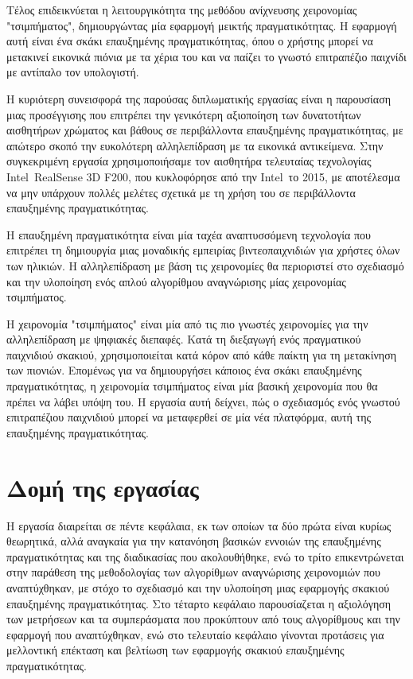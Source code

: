 Τέλος επιδεικνύεται η λειτουργικότητα της μεθόδου ανίχνευσης χειρονομίας "τσιμπήματος", δημιουργώντας μία εφαρμογή μεικτής πραγματικότητας. Η εφαρμογή αυτή είναι ένα σκάκι επαυξημένης πραγματικότητας, όπου ο χρήστης μπορεί να μετακινεί εικονικά πιόνια με τα χέρια του και να παίζει το γνωστό επιτραπέζιο παιχνίδι με αντίπαλο τον υπολογιστή.


Η κυριότερη συνεισφορά της παρούσας διπλωματικής εργασίας είναι η παρουσίαση μιας προσέγγισης που επιτρέπει την γενικότερη αξιοποίηση των δυνατοτήτων αισθητήρων χρώματος και βάθους σε περιβάλλοντα επαυξημένης πραγματικότητας, με απώτερο σκοπό την ευκολότερη αλληλεπίδραση με τα εικονικά αντικείμενα. Στην συγκεκριμένη εργασία χρησιμοποιήσαμε τον αισθητήρα τελευταίας τεχνολογίας Intel\textregistered\ RealSense\texttrademark{} 3D F200, που κυκλοφόρησε από την Intel\textregistered\ το 2015, με αποτέλεσμα να μην υπάρχουν πολλές μελέτες σχετικά με τη χρήση του σε περιβάλλοντα επαυξημένης πραγματικότητας.


Η επαυξημένη πραγματικότητα είναι μία ταχέα αναπτυσσόμενη τεχνολογία που επιτρέπει τη δημιουργία μιας μοναδικής εμπειρίας βιντεοπαιχνιδιών για χρήστες όλων των ηλικιών. Η αλληλεπίδραση με βάση τις χειρονομίες θα περιοριστεί στο σχεδιασμό και την υλοποίηση ενός απλού αλγορίθμου αναγνώρισης μίας χειρονομίας τσιμπήματος. 


Η χειρονομία "τσιμπήματος" είναι μία από τις πιο γνωστές χειρονομίες για την αλληλεπίδραση με ψηφιακές διεπαφές. Κατά τη διεξαγωγή ενός πραγματικού παιχνιδιού σκακιού, χρησιμοποιείται κατά κόρον από κάθε παίκτη για τη μετακίνηση των πιονιών. Επομένως για να δημιουργήσει κάποιος ένα σκάκι επαυξημένης πραγματικότητας, η χειρονομία τσιμπήματος είναι μία βασική χειρονομία που θα πρέπει να λάβει υπόψη του. Η εργασία αυτή δείχνει, πώς ο σχεδιασμός ενός γνωστού επιτραπέζιου παιχνιδιού μπορεί να μεταφερθεί σε μία νέα πλατφόρμα, αυτή της επαυξημένης πραγματικότητας.







\section{Δομή της εργασίας}



Η εργασία διαιρείται σε πέντε κεφάλαια, εκ των οποίων τα δύο πρώτα είναι κυρίως θεωρητικά, αλλά αναγκαία για την κατανόηση βασικών εννοιών της επαυξημένης πραγματικότητας και της διαδικασίας που ακολουθήθηκε, ενώ το τρίτο επικεντρώνεται στην παράθεση της μεθοδολογίας των αλγορίθμων αναγνώρισης χειρονομιών που αναπτύχθηκαν, με στόχο το σχεδιασμό και την υλοποίηση μιας εφαρμογής σκακιού επαυξημένης πραγματικότητας. Στο τέταρτο κεφάλαιο παρουσίαζεται η αξιολόγηση των μετρήσεων και τα συμπεράσματα που προκύπτουν από τους αλγορίθμους και την εφαρμογή που αναπτύχθηκαν, ενώ στο τελευταίο κεφάλαιο γίνονται προτάσεις για μελλοντική επέκταση και βελτίωση των εφαρμογής σκακιού επαυξημένης πραγματικότητας.



